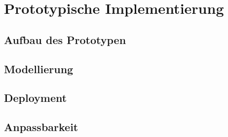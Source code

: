 
\chapter{Prototypische Implementierung}

\section{Aufbau des Prototypen}

\section{Modellierung}

\section{Deployment}

\section{Anpassbarkeit}